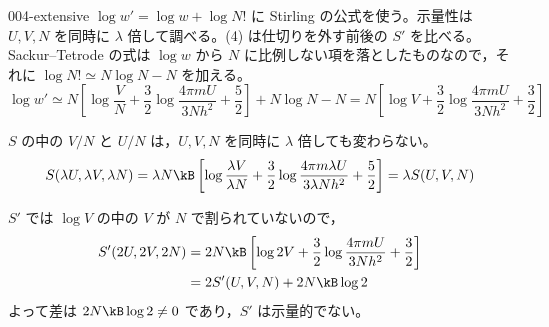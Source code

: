 \documentclass[uplatex,dvipdfmx,a4paper,11pt]{jsarticle}
\begin{document}
\kaitouhen
{}
\begin{kaisetsu}{004-extensive}
\houshin $\log w'=\log w+\log N!$ に Stirling の公式を使う。示量性は $U,V,N$ を同時に $\lambda$ 倍して調べる。(4) は仕切りを外す前後の $S'$ を比べる。
\keisan
{} Sackur--Tetrode の式は $\log w$ から $N$ に比例しない項を落としたものなので，それに $\log N!\simeq N\log N-N$ を加える。
\[\log w'\simeq N\left[\log\frac{V}{N}+\frac{3}{2}\log\frac{4\pi mU}{3Nh^{2}}+\frac{5}{2}\right]+N\log N-N=N\left[\log V+\frac{3}{2}\log\frac{4\pi mU}{3Nh^{2}}+\frac{3}{2}\right]\]

 $S$ の中の $V/N$ と $U/N$ は，$U,V,N$ を同時に $\lambda$ 倍しても変わらない。
\[S(\lambda U,\lambda V,\lambda N)=\lambda N\kB\left[\log\frac{\lambda V}{\lambda N}+\frac{3}{2}\log\frac{4\pi m\lambda U}{3\lambda Nh^{2}}+\frac{5}{2}\right]=\lambda S(U,V,N)\]

 $S'$ では $\log V$ の中の $V$ が $N$ で割られていないので，
\begin{align*}
S'(2U,2V,2N)&=2N\kB\left[\log2V+\frac{3}{2}\log\frac{4\pi mU}{3Nh^{2}}+\frac{3}{2}\right]\\
&=2S'(U,V,N)+2N\kB\log2
\end{align*}
よって差は $2N\kB\log2\neq0$ であり，$S'$ は示量的でない。


\end{kaisetsu}
\end{document}
